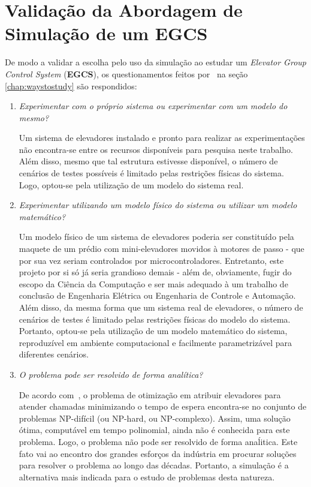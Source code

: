 \section{Validação da Abordagem de Simulação de um EGCS}

De modo a validar a escolha pelo uso da simulação ao estudar um \textit{Elevator
Group Control System} (\textbf{EGCS}), os questionamentos feitos
por~\cite{Banks,Law} na seção \ref{chap:waystostudy} são respondidos:

\begin{enumerate}
\item \textit{Experimentar com o próprio sistema ou experimentar com um modelo do mesmo?}

Um sistema de elevadores instalado e pronto para realizar as experimentações não
encontra-se entre os recursos disponíveis para pesquisa neste trabalho. Além
disso, mesmo que tal estrutura estivesse disponível, o número de cenários de
testes possíveis é limitado pelas restrições físicas do sistema. Logo, optou-se
pela utilização de um modelo do sistema real.

\item \textit{Experimentar utilizando um modelo físico do sistema ou utilizar um modelo
matemático?}

Um modelo físico de um sistema de elevadores poderia ser constituído pela
maquete de um prédio com mini-elevadores movidos à motores de passo - que por
sua vez seriam controlados por microcontroladores. Entretanto, este projeto por
si só já seria grandioso demais - além de, obviamente, fugir do escopo da
Ciência da Computação e ser mais adequado à um trabalho de conclusão de
Engenharia Elétrica ou Engenharia de Controle e Automação. Além disso, da mesma
forma que um sistema real de elevadores, o número de cenários de testes é
limitado pelas restrições físicas do modelo do sistema. Portanto, optou-se pela
utilização de um modelo matemático do sistema, reproduzível em ambiente
computacional e facilmente parametrizável para diferentes cenários.

\item \textit{O problema pode ser resolvido de forma analítica?}

De acordo com~\cite{SeKo99}, o problema de otimização em atribuir elevadores
para atender chamadas minimizando o tempo de espera encontra-se no conjunto de
problemas NP-difícil (ou NP-hard, ou NP-complexo). Assim, uma solução ótima,
computável em tempo polinomial, ainda não é conhecida para este problema. Logo,
o problema não pode ser resolvido de forma anaĺitica. Este fato vai ao encontro
dos grandes esforços da indústria em procurar soluções para resolver o problema
ao longo das décadas. Portanto, a simulação é a alternativa mais indicada para o
estudo de problemas desta natureza.

\end{enumerate}


